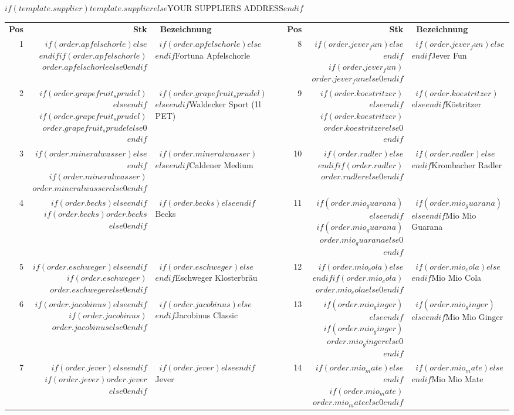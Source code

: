 \documentclass[backaddress=true]{scrlttr2}
\def\ordersupplier{$if(template.supplier)$$template.supplier$$else$YOUR SUPPLIERS ADDRESS$endif$ }
\def\ordercountapfelschorle{$if(order.apfelschorle)$$order.apfelschorle$$else$0$endif$}
\def\ordercountgrapefruitsprudel{$if(order.grapefruit_sprudel)$$order.grapefruit_sprudel$$else$0$endif$}
\def\ordercountmineralwasser{$if(order.mineralwasser)$$order.mineralwasser$$else$0$endif$}
\def\ordercountbierbecks{$if(order.becks)$$order.becks$$else$0$endif$}
\def\ordercountbiereschweger{$if(order.eschweger)$$order.eschweger$$else$0$endif$}
\def\ordercountbierjacobinus{$if(order.jacobinus)$$order.jacobinus$$else$0$endif$}
\def\ordercountbierjever{$if(order.jever)$$order.jever$$else$0$endif$}
\def\ordercountbierjeverfun{$if(order.jever_fun)$$order.jever_fun$$else$0$endif$}
\def\ordercountbierkoestritzer{$if(order.koestritzer)$$order.koestritzer$$else$0$endif$}
\def\ordercountbierradler{$if(order.radler)$$order.radler$$else$0$endif$}
\def\ordercountmioguarana{$if(order.mio_guarana)$$order.mio_guarana$$else$0$endif$}
\def\ordercountmiocola{$if(order.mio_cola)$$order.mio_cola$$else$0$endif$}
\def\ordercountmioginger{$if(order.mio_ginger)$$order.mio_ginger$$else$0$endif$}
\def\ordercountmiomate{$if(order.mio_mate)$$order.mio_mate$$else$0$endif$}
\def\cgray{\color[gray]{.6}}
\def\cgrayapfelschorle{$if(order.apfelschorle)$$else$\cgray$endif$}
\def\cgraygrapefruitsprudel{$if(order.grapefruit_sprudel)$$else$\cgray$endif$}
\def\cgraymineralwasser{$if(order.mineralwasser)$$else$\cgray$endif$}
\def\cgraybierbecks{$if(order.becks)$$else$\cgray$endif$}
\def\cgraybiereschweger{$if(order.eschweger)$$else$\cgray$endif$}
\def\cgraybierjacobinus{$if(order.jacobinus)$$else$\cgray$endif$}
\def\cgraybierjever{$if(order.jever)$$else$\cgray$endif$}
\def\cgraybierjeverfun{$if(order.jever_fun)$$else$\cgray$endif$}
\def\cgraybierkoestritzer{$if(order.koestritzer)$$else$\cgray$endif$}
\def\cgraybierradler{$if(order.radler)$$else$\cgray$endif$}
\def\cgraymioguarana{$if(order.mio_guarana)$$else$\cgray$endif$}
\def\cgraymiocola{$if(order.mio_cola)$$else$\cgray$endif$}
\def\cgraymioginger{$if(order.mio_ginger)$$else$\cgray$endif$}
\def\cgraymiomate{$if(order.mio_mate)$$else$\cgray$endif$}
\begin{document}
\setlength{\parindent}{0pt}

\begin{letter}{\ordersupplier}

\opening{}
\renewcommand{\arraystretch}{1.3}



\begin{tabular}{|r|r|p{}|p{}|r|r|p{}|}
    \cline{1-3} \cline{5-7}
    \cgray\textbf{Pos} & \textbf{Stk} & \textbf{\ Bezeichnung} & & \cgray\textbf{Pos} & \textbf{Stk} & \textbf{\ Bezeichnung} \\
     \cline{1-3} \cline{5-7}
     \cline{1-3} \cline{5-7} \cgray 1 & \cgrayapfelschorle      \ordercountapfelschorle      & \ \cgrayapfelschorle      Fortuna Apfelschorle      & & \cgray  8 & \cgraybierjeverfun    \ordercountbierjeverfun    & \ \cgraybierjeverfun    Jever Fun         \\
     \cline{1-3} \cline{5-7} \cgray 2 & \cgraygrapefruitsprudel \ordercountgrapefruitsprudel & \ \cgraygrapefruitsprudel Waldecker Sport (1l PET)  & & \cgray  9 & \cgraybierkoestritzer \ordercountbierkoestritzer & \ \cgraybierkoestritzer Köstritzer        \\
     \cline{1-3} \cline{5-7} \cgray 3 & \cgraymineralwasser     \ordercountmineralwasser     & \ \cgraymineralwasser     Caldener Medium           & & \cgray 10 & \cgraybierradler      \ordercountbierradler      & \ \cgraybierradler      Krombacher Radler  \\
     \cline{1-3} \cline{5-7} \cgray 4 & \cgraybierbecks         \ordercountbierbecks         & \ \cgraybierbecks         Becks                     & & \cgray 11 & \cgraymioguarana       \ordercountmioguarana       & \ \cgraymioguarana       Mio Mio Guarana \\
     \cline{1-3} \cline{5-7} \cgray 5 & \cgraybiereschweger     \ordercountbiereschweger     & \ \cgraybiereschweger     Eschweger Klosterbräu     & & \cgray 12 & \cgraymiocola         \ordercountmiocola         & \ \cgraymiocola         Mio Mio Cola      \\
     \cline{1-3} \cline{5-7} \cgray 6 & \cgraybierjacobinus     \ordercountbierjacobinus     & \ \cgraybierjacobinus     Jacobinus Classic         & & \cgray 13 & \cgraymioginger       \ordercountmioginger       & \ \cgraymioginger       Mio Mio Ginger    \\
     \cline{1-3} \cline{5-7} \cgray 7 & \cgraybierjever         \ordercountbierjever         & \ \cgraybierjever         Jever                     & & \cgray 14 & \cgraymiomate         \ordercountmiomate         & \ \cgraymiomate         Mio Mio Mate      \\
     \cline{1-3} \cline{5-7}
\end{tabular}
\\[\baselineskip]


\end{letter}
\end{document}
